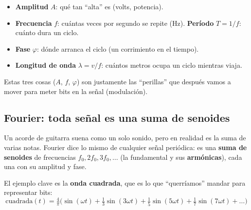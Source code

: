 \documentclass[10pt,a4paper]{article}
\newcommand{\term}[1]{\textbf{\color{azul}#1}}
\begin{document}
\begin{itemize}
  \item \term{Amplitud} $A$: qué tan ``alta'' es (volts, potencia).
  \item \term{Frecuencia} $f$: cuántas veces por segundo se repite (Hz). \term{Período} $T=1/f$: cuánto dura un ciclo.
  \item \term{Fase} $\varphi$: dónde arranca el ciclo (un corrimiento en el tiempo).
  \item \term{Longitud de onda} $\lambda = v/f$: cuántos metros ocupa un ciclo mientras viaja.
\end{itemize}
Estas tres cosas ($A$, $f$, $\varphi$) son justamente las ``perillas'' que después vamos a mover para meter bits en la señal (modulación).

\subsection{Fourier: toda señal es una suma de senoides}
\begin{idea}
Un acorde de guitarra suena como un solo sonido, pero en realidad es la suma de varias notas.
Fourier dice lo mismo de cualquier señal periódica: es una \textbf{suma de senoides} de frecuencias
$f_0, 2f_0, 3f_0, \dots$ (la fundamental y sus \term{armónicas}), cada una con su amplitud y fase.
\end{idea}

El ejemplo clave es la \textbf{onda cuadrada}, que es lo que ``querríamos'' mandar para representar bits:
\[ \text{cuadrada}(t) = \tfrac{4}{\pi}\Big(\sin(\omega t) + \tfrac13\sin(3\omega t) + \tfrac15\sin(5\omega t) + \tfrac17\sin(7\omega t) + \dots\Big) \]

\begin{center}
\end{center}
\end{document}
